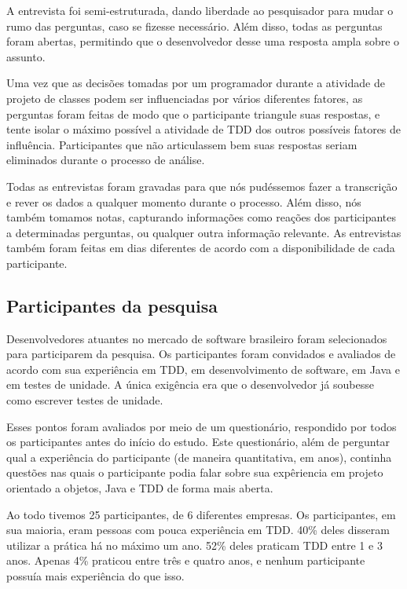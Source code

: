 \documentclass[conference]{IEEEtran}
\begin{document}
A entrevista foi semi-estruturada, dando liberdade ao
pesquisador para mudar o rumo das perguntas, caso se fizesse necessário.
Além disso, todas as perguntas foram abertas, permitindo que o desenvolvedor desse
uma resposta ampla sobre o assunto.

Uma vez que as decisões tomadas por um programador durante a atividade de projeto de classes
podem ser influenciadas por vários diferentes fatores, 
as perguntas foram feitas de modo que o participante triangule suas respostas,
e tente isolar o máximo possível a atividade de TDD dos outros possíveis fatores
de influência. Participantes que não articulassem bem suas respostas seriam eliminados
durante o processo de análise.

Todas as entrevistas foram gravadas para que nós pudéssemos fazer a
transcrição e rever os dados a qualquer momento durante o processo. Além disso,
nós também tomamos notas, capturando informações como reações dos 
participantes a determinadas perguntas, ou qualquer outra informação relevante. 
As entrevistas também foram feitas em dias diferentes de acordo com a disponibilidade
de cada participante.

\subsection{Participantes da pesquisa}
\label{sec:planejamento-participantes}

Desenvolvedores atuantes no mercado de 
software brasileiro foram selecionados para participarem da pesquisa.
Os participantes foram convidados e avaliados de acordo com sua experiência em TDD,
em desenvolvimento de software, em Java e em testes de unidade. A única exigência
era que o desenvolvedor já soubesse como escrever testes de unidade.

Esses pontos foram avaliados por meio de um questionário, 
respondido por todos os participantes antes do início do estudo. 
Este questionário, além de perguntar qual a experiência
do participante (de maneira quantitativa, em anos), 
continha questões nas quais o participante
podia falar sobre sua expêriencia em projeto orientado a objetos,
Java e TDD de forma mais aberta.

Ao todo tivemos 25 participantes, de 6 diferentes empresas.
Os participantes, em sua maioria, eram pessoas com pouca experiência em TDD.
40\% deles disseram utilizar a prática há no máximo um ano. 52\% deles praticam TDD
entre 1 e 3 anos. Apenas 4\% praticou entre três e quatro anos, e nenhum participante
possuía mais experiência do que isso. 
\end{document}
